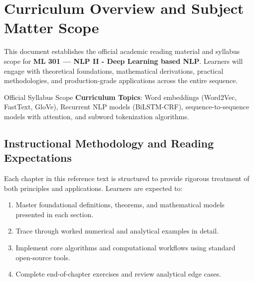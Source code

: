 \section{Curriculum Overview and Subject Matter Scope}

This document establishes the official academic reading material and syllabus scope for \textbf{ML 301 --- NLP II - Deep Learning based NLP}. Learners will engage with theoretical foundations, mathematical derivations, practical methodologies, and production-grade applications across the entire sequence.

\begin{InsightBox}{Official Syllabus Scope}
  \textbf{Curriculum Topics}: Word embeddings (Word2Vec, FastText, GloVe), Recurrent NLP models (BiLSTM-CRF), sequence-to-sequence models with attention, and subword tokenization algorithms.
\end{InsightBox}

\subsection{Instructional Methodology and Reading Expectations}

Each chapter in this reference text is structured to provide rigorous treatment of both principles and applications. Learners are expected to:
\begin{enumerate}
  \item Master foundational definitions, theorems, and mathematical models presented in each section.
  \item Trace through worked numerical and analytical examples in detail.
  \item Implement core algorithms and computational workflows using standard open-source tools.
  \item Complete end-of-chapter exercises and review analytical edge cases.
\end{enumerate}

